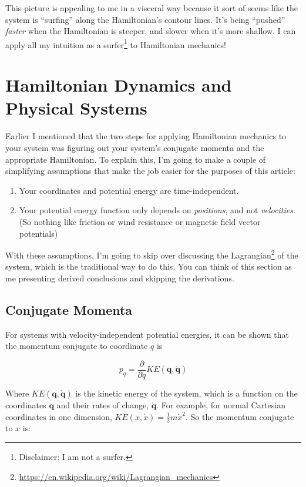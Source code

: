 \documentclass[]{article}
\renewcommand{\href}[2]{#2\footnote{\url{#1}}}
\begin{document}
This picture is appealing to me in a visceral way because it sort of seems like
the system is ``surfing'' along the Hamiltonian's contour lines. It's being
``pushed'' \emph{faster} when the Hamiltonian is steeper, and slower when it's
more shallow. I can apply all my intuition as a surfer\footnote{Disclaimer: I am
  not a surfer.} to Hamiltonian mechanics!

\hypertarget{hamiltonian-dynamics-and-physical-systems}{%
\section{Hamiltonian Dynamics and Physical
Systems}\label{hamiltonian-dynamics-and-physical-systems}}

Earlier I mentioned that the two steps for applying Hamiltonian mechanics to
your system was figuring out your system's conjugate momenta and the appropriate
Hamiltonian. To explain this, I'm going to make a couple of simplifying
assumptions that make the job easier for the purposes of this article:

\begin{enumerate}
\def\labelenumi{\arabic{enumi}.}
\tightlist
\item
  Your coordinates and potential energy are time-independent.
\item
  Your potential energy function only depends on \emph{positions}, and not
  \emph{velocities}. (So nothing like friction or wind resistance or magnetic
  field vector potentials)
\end{enumerate}

With these assumptions, I'm going to skip over discussing the
\href{https://en.wikipedia.org/wiki/Lagrangian_mechanics}{Lagrangian} of the
system, which is the traditional way to do this. You can think of this section
as me presenting derived conclusions and skipping the derivations.

\hypertarget{conjugate-momenta}{%
\subsection{Conjugate Momenta}\label{conjugate-momenta}}

For systems with velocity-independent potential energies, it can be shown that
the momentum conjugate to coordinate \(q\) is

\[
p_q = \frac{\partial}{\partial \dot{q}} KE(\mathbf{q}, \dot{\mathbf{q}})
\]

Where \(KE(\mathbf{q},\dot{\mathbf{q}})\) is the kinetic energy of the system,
which is a function on the coordinates \(\mathbf{q}\) and their rates of change,
\(\dot{\mathbf{q}}\). For example, for normal Cartesian coordinates in one
dimension, \(KE(x, \dot{x}) = \frac{1}{2} m \dot{x}^2\). So the momentum
conjugate to \(x\) is:
\end{document}
